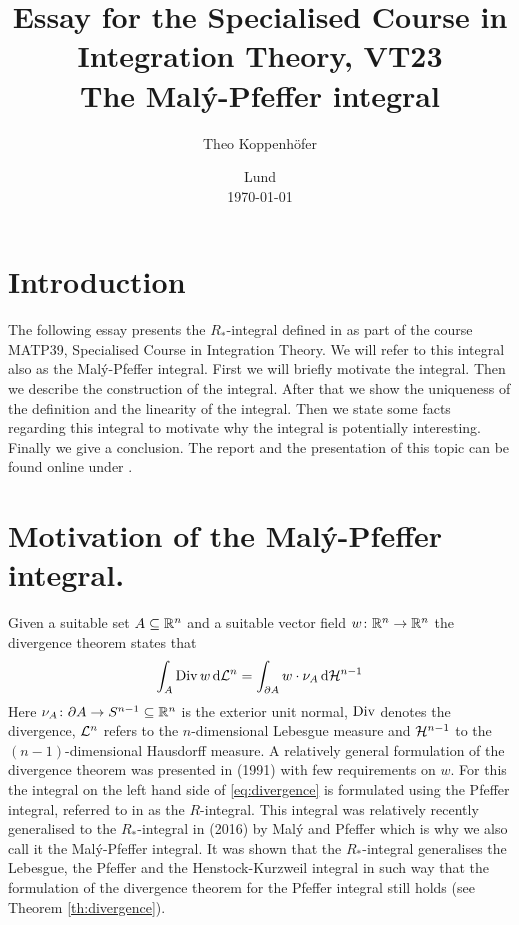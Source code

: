 




\title{ Essay for the Specialised Course in Integration Theory, VT23 \\[1ex]
	  \large The Malý-Pfeffer integral}
\author{Theo Koppenhöfer}
\date{Lund \\[1ex] \today}







\maketitle

\section{Introduction}

The following essay presents the $R_*$-integral defined in \cite{Pfe2016} as part of the course MATP39, Specialised Course in Integration Theory. We will refer to this integral also as the Malý-Pfeffer integral. First we will briefly motivate the integral. Then we describe the construction of the integral. After that we show the uniqueness of the definition and the linearity of the integral. Then we state some facts regarding this integral to motivate why the integral is potentially interesting. Finally we give a conclusion. The report and the presentation of this topic can be found online under \cite{Repository}.


\section{Motivation of the Malý-Pfeffer integral.}

Given a suitable set $A\subseteq\mathbb{R}^n$ and a suitable vector field $w\colon\mathbb{R}^n\to\mathbb{R}^n$ the divergence theorem states that
\begin{align}
	\int_A\operatorname{Div} w\,\mathrm{d} \mathcal{L}^n=\int_{\partial A}w\cdot\nu_A\,\mathrm{d} \mathcal{H}^{n-1}\label{eq:divergence}
\end{align}
Here $\nu_A\colon \partial A\to S^{n-1}\subseteq\mathbb{R}^n$ is the exterior unit normal, $\operatorname{Div}$ denotes the divergence, $\mathcal{L}^n$ refers to the $n$-dimensional Lebesgue measure and $\mathcal{H}^{n-1}$ to the $(n-1)$-dimensional Hausdorff measure. A relatively general formulation of the divergence theorem was presented in \cite{Pfe1991} (1991) with few requirements on $w$. For this the integral on the left hand side of \eqref{eq:divergence} is formulated using the Pfeffer integral, referred to in \cite{Pfe2016} as the $R$-integral. This integral was relatively recently generalised to the $R_*$-integral in \cite{Pfe2016} (2016) by Malý and Pfeffer which is why we also call it the Malý-Pfeffer integral. It was shown that the $R_*$-integral generalises the Lebesgue, the Pfeffer and the Henstock-Kurzweil integral in such way that the formulation of the divergence theorem for the Pfeffer integral still holds (see Theorem \ref{th:divergence}).

